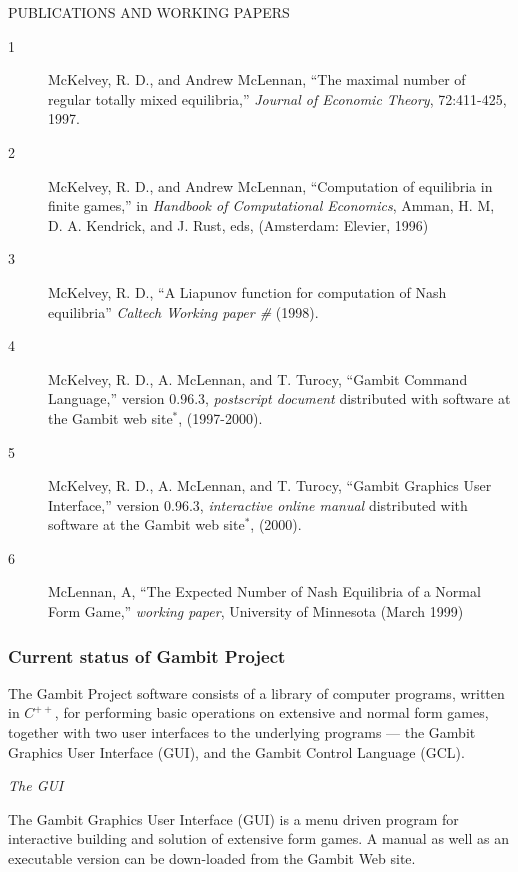 \documentclass[12pt]{article}
\begin{document}
\bigskip
\centerline{ PUBLICATIONS AND WORKING PAPERS}
\begin{description}
\item[1] McKelvey, R. D., and Andrew McLennan, ``The maximal number of
regular totally mixed equilibria,'' \textit{Journal of Economic
Theory}, 72:411-425, 1997.

\item[2] McKelvey, R. D., and Andrew McLennan, ``Computation of
equilibria in finite games,'' in \textit{Handbook of Computational
Economics}, Amman, H. M, D. A. Kendrick, and J. Rust, eds, (Amsterdam:
Elevier, 1996)

\item[3] McKelvey, R. D., ``A Liapunov function for computation of
Nash equilibria'' \textit{Caltech Working paper \#} (1998).

\item[4] McKelvey, R. D., A. McLennan, and T. Turocy, ``Gambit
Command Language,'' version 0.96.3, \textit{postscript document}
distributed with software at the Gambit web site$^*$, (1997-2000).

\item[5] McKelvey, R. D., A. McLennan, and T. Turocy, ``Gambit
Graphics User Interface,'' version 0.96.3, \textit{interactive online
manual} distributed with software at the Gambit web site$^*$, (2000).

\item[6] McLennan, A, ``The Expected Number of Nash Equilibria of a
Normal Form Game,'' \textit{working paper}, University of Minnesota
(March 1999)
\end{description}


\subsubsection{Current status of Gambit Project}

The Gambit Project software consists of a library of computer
programs, written in $C^{++}$, for performing basic operations on
extensive and normal form games, together with two user interfaces to
the underlying programs --- the Gambit Graphics User Interface (GUI),
and the Gambit Control Language (GCL).

\bigskip
\noindent
{\em The GUI}

\smallskip
\noindent
The Gambit Graphics User Interface (GUI) is a menu driven program for
interactive building and solution of extensive form games.  A manual
as well as an executable version can be down-loaded from the Gambit
Web site.
\end{document}
